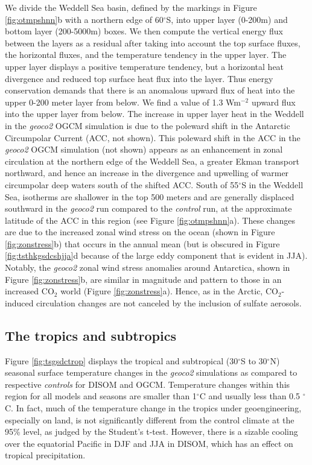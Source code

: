 \documentclass[12pt]{article}
\newcommand{\sectdef}{\subsection} %
\begin{document}
We divide the Weddell Sea basin, defined by the markings in Figure \ref{fig:otmpshnn}b with a northern edge of 60$^\circ$S, into upper layer (0-200m) and bottom layer (200-5000m) boxes. We then compute the vertical energy flux between the layers as a residual after taking into account the top surface fluxes, the horizontal fluxes, and the temperature tendency in the upper layer. The upper layer displays a positive temperature tendency, but a horizontal heat divergence and reduced top surface heat flux into the layer. Thus energy conservation demands that there is an anomalous upward flux of heat into the upper 0-200 meter layer from below. We find a value of 1.3 Wm$^{-2}$ upward flux into the upper layer from below. The increase in upper layer heat in the Weddell in the \textit{geoco2} OGCM simulation is due to the poleward shift in the Antarctic Circumpolar Current (ACC, not shown). This poleward shift in the ACC in the \textit{geoco2} OGCM simulation (not shown) appears as an enhancement in zonal circulation at the northern edge of the Weddell Sea, a greater Ekman transport northward, and hence an increase in the divergence and upwelling of warmer circumpolar deep waters south of the shifted ACC. South of 55$^\circ$S in the Weddell Sea, isotherms are shallower in the top 500 meters and are generally displaced southward in the \textit{geoco2} run compared to the \textit{control} run, at the approximate latitude of the ACC in this region (see Figure \ref{fig:otmpshnn}a). These changes are due to the increased zonal wind stress on the ocean (shown in Figure \ref{fig:zonstress}b) that occurs in the annual mean (but is obscured in Figure \ref{fig:tsthkgsdcshjja}d because of the large eddy component that is evident in JJA). Notably, the \textit{geoco2} zonal wind stress anomalies around Antarctica, shown in Figure \ref{fig:zonstress}b, are similar in magnitude and pattern to those in an increased CO$_2$ world (Figure \ref{fig:zonstress}a). Hence, as in the Arctic, CO$_2$-induced circulation changes are not canceled by the inclusion of sulfate aerosols.

\sectdef{The tropics and subtropics}

Figure \ref{fig:tsgsdctrop} displays the tropical and subtropical (30$^\circ$S to 30$^\circ$N) seasonal surface temperature changes in the \textit{geoco2} simulations as compared to respective \textit{controls} for DISOM and OGCM. Temperature changes within this region for all models and seasons are smaller than 1$^\circ$C and usually less than 0.5 $^\circ$C. In fact, much of the temperature change in the tropics under geoengineering, especially on land, is not significantly different from the control climate at the 95\% level, as judged by the Student's t-test. However, there is a sizable cooling over the equatorial Pacific in DJF and JJA in DISOM, which has an effect on tropical precipitation. 
\end{document}
